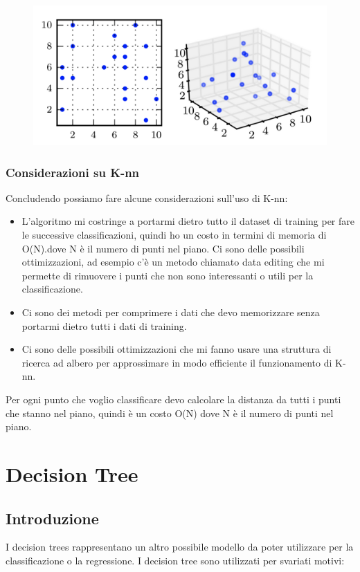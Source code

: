 \documentclass[14pt]{extreport}
\begin{document}
\begin{figure}[H]
	\centering
	\includegraphics[width=0.7\linewidth]{474.jpeg}
\end{figure}

\subsection{Considerazioni su K-nn}

Concludendo possiamo fare alcune considerazioni sull’uso di K-nn:
\begin{itemize}
	\item L’algoritmo mi costringe a portarmi dietro tutto il dataset di training per fare le successive classificazioni, quindi ho un costo in
	      termini di memoria di O(N).dove N è il numero di punti nel piano. Ci sono delle possibili ottimizzazioni, ad esempio c’è un metodo chiamato
	      data editing che mi permette di rimuovere i punti che non sono interessanti o utili per la classificazione.
	\item Ci sono dei metodi per comprimere i dati che devo memorizzare senza portarmi dietro tutti i dati di training.
	\item Ci sono delle possibili ottimizzazioni che mi fanno usare una struttura di ricerca ad albero per approssimare in modo efficiente il
funzionamento di K-nn. \end{itemize}Per ogni punto che voglio classificare devo calcolare la distanza da tutti i punti che stanno nel piano, quindi è
un costo O(N) dove N è il numero di punti nel piano.


\chapter{Decision Tree}

\section{Introduzione}

I decision trees rappresentano un altro possibile modello da poter utilizzare per la classificazione o la regressione. I decision tree sono utilizzati
per svariati motivi:
\end{document}
